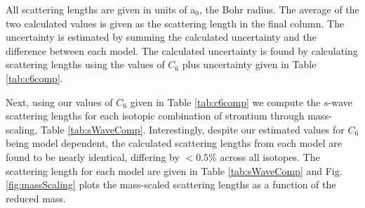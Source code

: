 \begin{table}[]
\centering
{}
\caption{Comparison of calculated $s$-wave scattering lengths}{All scattering lengths are given in units of a$_0$, the Bohr radius. The average of the two calculated values is given as the scattering length in the final column. The uncertainty is estimated by summing the calculated uncertainty and the difference between each model. The calculated uncertainty is found by calculating scattering lengths using the values of $C_6$ plus uncertainty given in Table \ref{tab:c6comp}.}
\label{tab:sWaveComp}
\end{table}
Next, using our values of $C_6$ given in Table \ref{tab:c6comp} we compute the $s$-wave scattering lengths for each isotopic combination of strontium through mass-scaling, Table \ref{tab:sWaveComp}.
Interestingly, despite our estimated values for $C_6$ being model dependent, the calculated scattering lengths from each model are found to be nearly identical, differing by $< 0.5$\% across all isotopes.
The scattering length for each model are given in Table \ref{tab:sWaveComp} and Fig.\,\ref{fig:massScaling} plots the mass-scaled scattering lengths as a function of the reduced mass.

